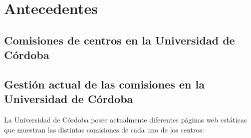 \chapter{Antecedentes}\label{cap:antecedentes}

\section{Comisiones de centros en la Universidad de Córdoba}

\section{Gestión actual de las comisiones en la Universidad de Córdoba}

La Universidad de Córdoba posee actualmente diferentes páginas web estáticas que muestran las distintas comisiones de cada uno de los centros:
    

